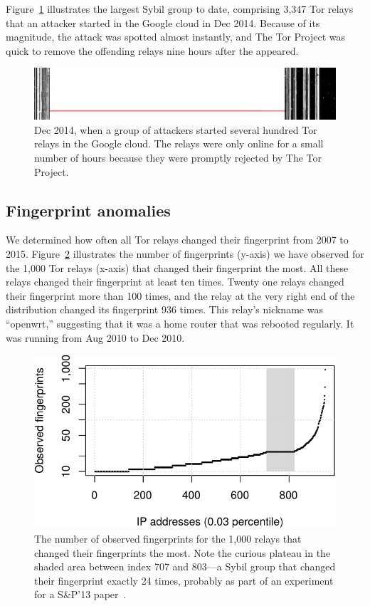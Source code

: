 Figure~\ref{fig:2014-12-lizard} illustrates the largest Sybil group to date,
comprising 3,347 Tor relays that an attacker started in the Google cloud in
Dec 2014.  Because of its magnitude, the attack was spotted almost
instantly, and The Tor Project was quick to remove the offending relays nine
hours after the appeared.

\begin{figure}[t]
	\centering
	\includegraphics[width=\linewidth]{diagrams/2014-12.jpg}
	\caption{Dec 2014, when a group of attackers started several hundred Tor
	relays in the Google cloud.  The relays were only online for a small number
	of hours because they were promptly rejected by The Tor Project.}
	\label{fig:2014-12-lizard}
\end{figure}

\subsection{Fingerprint anomalies}
\label{sec:fingerprint-anomalies}
We determined how often all Tor relays changed their fingerprint from 2007 to
2015.  Figure~\ref{fig:fingerprints} illustrates the number of fingerprints
(y-axis) we have observed for the 1,000 Tor relays (x-axis) that changed their
fingerprint the most.  All these relays changed their fingerprint at least ten
times.  Twenty one relays changed their fingerprint more than 100 times, and the
relay at the very right end of the distribution changed its fingerprint 936
times.  This relay's nickname was ``openwrt,'' suggesting that it was a home
router that was rebooted regularly.  It was running from Aug 2010 to Dec 2010.

\begin{figure}[t]
	\centering
	\includegraphics[width=0.8\linewidth]{diagrams/fingerprints.pdf}
	\caption{The number of observed fingerprints for the 1,000 relays that
	changed their fingerprints the most.  Note the curious plateau in the shaded
	area between index 707 and 803---a Sybil group that changed their
	fingerprint exactly 24 times, probably as part of an experiment for a
	S\&P'13 paper~\cite{Biryukov2013a}.}
	\label{fig:fingerprints}
\end{figure}

